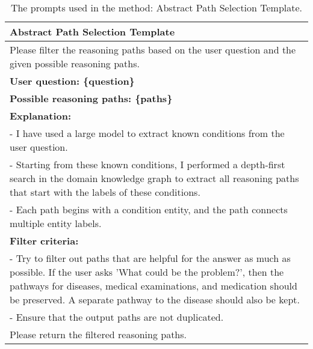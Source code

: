 \begin{table}[h]
    \centering
    \caption{The prompts used in the method: Abstract Path Selection Template.}
    \label{table:template2}
    \begin{tabularx}{\textwidth}{X} %
        \toprule
        \textbf{Abstract Path Selection Template} \\
        \midrule
        \vspace{2mm}
        Please filter the reasoning paths based on the user question and the given possible reasoning paths. \\
        \textbf{User question: \{question\}} \\
        \textbf{Possible reasoning paths: \{paths\}} \\
        \vspace{2mm}
        \textbf{Explanation:} \\
        - I have used a large model to extract known conditions from the user question. \\
        - Starting from these known conditions, I performed a depth-first search in the domain knowledge graph to extract all reasoning paths that start with the labels of these conditions. \\
        - Each path begins with a condition entity, and the path connects multiple entity labels. \\
        \vspace{2mm}
        \textbf{Filter criteria:} \\
        - Try to filter out paths that are helpful for the answer as much as possible. If the user asks 'What could be the problem?', then the pathways for diseases, medical examinations, and medication should be preserved. A separate pathway to the disease should also be kept. \\
        - Ensure that the output paths are not duplicated. \\
        \vspace{2mm}
        Please return the filtered reasoning paths. \\
        \bottomrule
    \end{tabularx}
\end{table}



